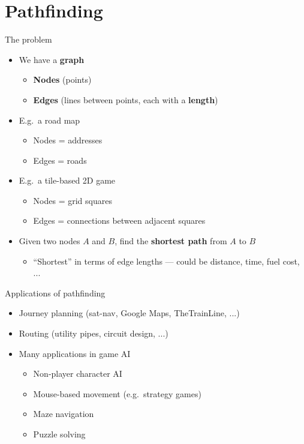 \part{Pathfinding}
\frame{\partpage}

\begin{frame}{The problem}
    \begin{itemize}
        \item We have a \textbf{graph}
            \begin{itemize}
                \item \textbf{Nodes} (points)
                \item \textbf{Edges} (lines between points, each with a \textbf{length})
            \end{itemize}
        \item E.g.\ a road map
            \begin{itemize}
                \item Nodes = addresses
                \item Edges = roads
            \end{itemize}
        \item E.g.\ a tile-based 2D game
            \begin{itemize}
                \item Nodes = grid squares
                \item Edges = connections between adjacent squares
            \end{itemize}
        \item Given two nodes $A$ and $B$, find the \textbf{shortest path} from $A$ to $B$
            \begin{itemize}
                \item ``Shortest'' in terms of edge lengths --- could be distance, time, fuel cost, ...
            \end{itemize}
    \end{itemize}
\end{frame}

\begin{frame}{Applications of pathfinding}
    \begin{itemize}
        \item Journey planning (sat-nav, Google Maps, TheTrainLine, ...)
        \item Routing (utility pipes, circuit design, ...)
        \item Many applications in game AI
            \begin{itemize}
                \item Non-player character AI
                \item Mouse-based movement (e.g.\ strategy games)
                \item Maze navigation
                \item Puzzle solving
            \end{itemize}
    \end{itemize}
\end{frame}

